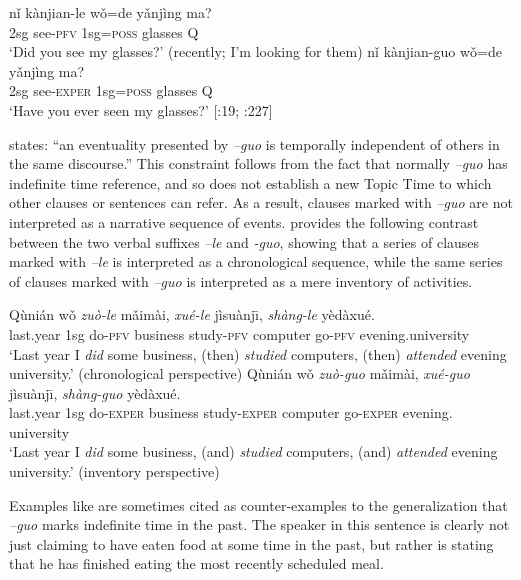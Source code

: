 \ea
\ea  \gll nǐ  kànjian-le  wǒ=de  yǎnjìng  ma?\\
2sg  see-\textsc{pfv}  1sg=\textsc{poss}  glasses  Q\\
\glt ‘Did you see my glasses?’ (recently; I’m looking for them)
\ex \gll  nǐ  kànjian-guo  wǒ=de  yǎnjìng  ma?\\
2sg  see-\textsc{exper}  1sg=\textsc{poss}  glasses  Q\\
\glt ‘Have you ever seen my glasses?’  [\citealt{Ma1977}:19; \citealt{LiThompson1981}:227]
\z \z


\citet{Wu2009} states: “an eventuality presented by \textit{–guo} is temporally independent of others in the same discourse.” This constraint follows from the fact that normally \textit{–guo} has indefinite time reference, and so does not establish a new Topic Time to which other clauses or sentences can refer. As a result, clauses marked with \textit{–guo} are not interpreted as a narrative sequence of events. \citet[308]{Iljic1990} provides the following contrast between the two verbal suffixes \textit{–le} and \textit{-guo}, showing that a series of clauses marked with \textit{–le} is interpreted as a chronological sequence, while the same series of clauses marked with \textit{–guo} is interpreted as a mere inventory of activities.


\ea

\ea \gll  Qùnián  wǒ  \textit{zuò-le}  mǎimài,  \textit{xué-le}  jìsuànj\={\i},  \textit{shàng-le}  yèdàxué.\\
last.year  1sg  do-\textsc{pfv}  business  study-\textsc{pfv}  computer  go-\textsc{pfv}  evening.university\\
\glt ‘Last year I \textit{did} some business, (then) \textit{studied} computers, (then) \textit{attended} evening university.’ (chronological perspective)
\ex \gll  Qùnián  wǒ  \textit{zuò-guo}  mǎimài,  \textit{xué-guo}  jìsuànj\={\i},  \textit{shàng-guo}  yèdàxué.\\
last.year  1sg  do-\textsc{exper}  business  study-\textsc{exper}  computer  go-\textsc{exper}  evening.          university\\
\glt ‘Last year I \textit{did} some business, (and) \textit{studied} computers, (and) \textit{attended} evening university.’ (inventory perspective)
\z \z


Examples like  are sometimes cited as counter-examples to the generalization that \textit{–guo} marks indefinite time in the past. The speaker in this sentence is clearly not just claiming to have eaten food at some time in the past, but rather is stating that he has finished eating the most recently scheduled meal.


